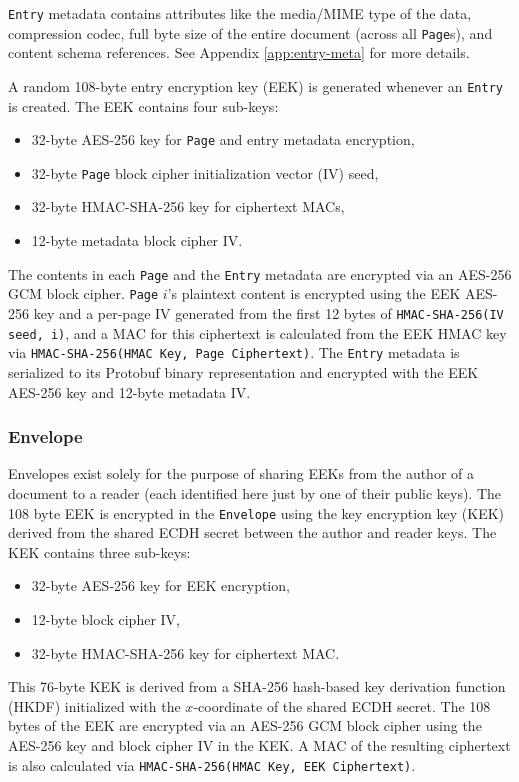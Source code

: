 \documentclass[10pt]{article}
\newcommand{\ttt}[1]{\texttt{#1}}
\def\Entry{\ttt{Entry}}
\def\Page{\ttt{Page}}
\def\Envelope{\ttt{Envelope}}
\begin{document}
\Entry{} metadata contains attributes like the media/MIME type of the data, compression codec, full byte size of the entire document (across all \Page{}s), and content schema references. See Appendix \ref{app:entry-meta} for more details. 

A random 108-byte entry encryption key (EEK) is generated whenever an \Entry{} is created. The EEK contains four sub-keys:
\begin{itemize}
	\item 32-byte AES-256 key for \Page{} and entry metadata encryption,
	\item 32-byte \Page{} block cipher initialization vector (IV) seed,
	\item 32-byte HMAC-SHA-256 key for ciphertext MACs,
	\item 12-byte metadata block cipher IV.
\end{itemize}
The contents in each \Page{} and the \Entry{} metadata are encrypted via an AES-256 GCM block cipher. \Page{} $i$'s plaintext content is encrypted using the EEK AES-256 key and a per-page IV generated from the first 12 bytes of \ttt{HMAC-SHA-256(IV seed, i)}, and a MAC for this ciphertext is calculated from the EEK HMAC key via \ttt{HMAC-SHA-256(HMAC Key, Page Ciphertext)}. The \Entry{} metadata is serialized to its Protobuf binary representation and encrypted with the EEK AES-256 key and 12-byte metadata IV. 

\subsubsection{Envelope}
Envelopes exist solely for the purpose of sharing EEKs from the author of a document to a reader (each identified here just by one of their public keys). The 108 byte EEK is encrypted in the \Envelope{} using the key encryption key (KEK) derived from the shared ECDH secret between the author and reader keys. The KEK contains three sub-keys:
\begin{itemize}
	\item 32-byte AES-256 key for EEK encryption,
	\item 12-byte block cipher IV,
	\item 32-byte HMAC-SHA-256 key for ciphertext MAC.
\end{itemize}
This 76-byte KEK is derived from a SHA-256 hash-based key derivation function (HKDF) initialized with the $x$-coordinate of the shared ECDH secret. The 108 bytes of the EEK are encrypted via an AES-256 GCM block cipher using the AES-256 key and block cipher IV in the KEK. A MAC of the resulting ciphertext is also calculated via \ttt{HMAC-SHA-256(HMAC Key, EEK Ciphertext)}.
\end{document}

